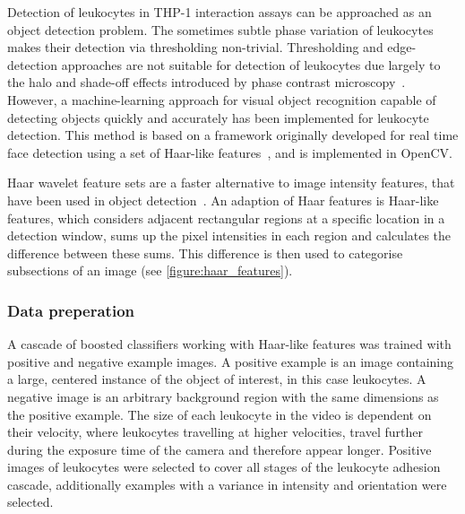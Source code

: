 Detection of leukocytes in THP-1 interaction assays can be approached as an object detection problem. The sometimes subtle phase variation of leukocytes makes their detection via thresholding non-trivial. Thresholding and edge-detection approaches are not suitable for detection of leukocytes due largely to the halo and shade-off effects introduced by phase contrast microscopy~\cite{Yin2012}. However, a machine-learning approach for visual object recognition capable of detecting objects quickly and accurately has been implemented for leukocyte detection. This method is based on a framework originally developed for real time face detection using a set of Haar-like features~\cite{Viola2001, Lienhart2002}, and is implemented in OpenCV.

Haar wavelet feature sets are a faster alternative to image intensity features, that have been used in object detection~\cite{Papageorgiou1998}. An adaption of Haar features is Haar-like features, which considers adjacent rectangular regions at a specific location in a detection window, sums up the pixel intensities in each region and calculates the difference between these sums. This difference is then used to categorise subsections of an image (see \autoref{figure:haar_features}).

\subsubsection{Data preperation}
A cascade of boosted classifiers working with Haar-like features was trained with positive and negative example images. A positive example is an image containing a large, centered instance of the object of interest, in this case leukocytes. A negative image is an arbitrary background region with the same dimensions as the positive example. The size of each leukocyte in the video is dependent on their velocity, where leukocytes travelling at higher velocities, travel further during the exposure time of the camera and therefore appear longer. Positive images of leukocytes were selected to cover all stages of the leukocyte adhesion cascade, additionally examples with a variance in intensity and orientation were selected.

